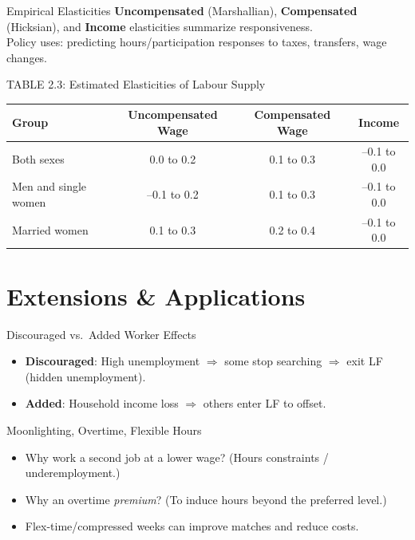 \documentclass[aspectratio=169]{beamer}
\begin{document}
\begin{frame}{Empirical Elasticities}
\transfade
\textbf{Uncompensated} (Marshallian), \textbf{Compensated} (Hicksian), and \textbf{Income} elasticities summarize responsiveness.\\[0.3em]
Policy uses: predicting hours/participation responses to taxes, transfers, wage changes.

\end{frame}

\begin{frame}{TABLE 2.3: Estimated Elasticities of Labour Supply}
\transfade
\small
\begin{tabular}{lccc}
\toprule
\textbf{Group} & \textbf{Uncompensated Wage} & \textbf{Compensated Wage} & \textbf{Income} \\
\midrule
Both sexes & 0.0 to 0.2 & 0.1 to 0.3 & --0.1 to 0.0 \\
Men and single women & --0.1 to 0.2 & 0.1 to 0.3 & --0.1 to 0.0 \\
Married women & 0.1 to 0.3 & 0.2 to 0.4 & --0.1 to 0.0 \\
\bottomrule
\end{tabular}

\vspace{0.25em}

\end{frame}

\section{Extensions \& Applications}

\begin{frame}{Discouraged vs.\ Added Worker Effects}
\transfade
\begin{itemize}[<+->]
  \item \textbf{Discouraged}: High unemployment \(\Rightarrow\) some stop searching \(\Rightarrow\) exit LF (hidden unemployment).
  \item \textbf{Added}: Household income loss \(\Rightarrow\) others enter LF to offset.
\end{itemize}

\end{frame}

\begin{frame}{Moonlighting, Overtime, Flexible Hours}
\transfade
\begin{itemize}[<+->]
  \item Why work a second job at a lower wage? (Hours constraints / underemployment.)
  \item Why an overtime \textit{premium}? (To induce hours beyond the preferred level.)
  \item Flex-time/compressed weeks can improve matches and reduce costs.
\end{itemize}

\end{frame}
\end{document}
